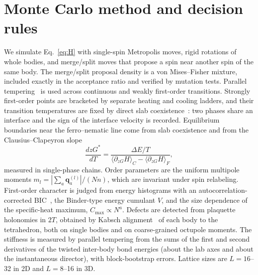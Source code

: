 \documentclass[pre,twocolumn,superscriptaddress,amsmath,amssymb,floatfix]{revtex4-2}
\newcommand{\qv}{\mathbf{q}}
\begin{document}
\section{Monte Carlo method and decision rules}\label{sec:MC}

We simulate Eq.~\eqref{eq:H} with single-spin Metropolis moves, rigid rotations of whole bodies, and merge/split moves that propose a spin near another spin of the same body. The merge/split proposal density is a von Mises--Fisher mixture, included exactly in the acceptance ratio and verified by mutation tests. Parallel tempering~\cite{Hukushima1996} is used across continuous and weakly first-order transitions. Strongly first-order points are bracketed by separate heating and cooling ladders, and their transition temperatures are fixed by direct slab coexistence~\cite{Espinosa2013}: two phases share an interface and the sign of the interface velocity is recorded. Equilibrium boundaries near the ferro--nematic line come from slab coexistence and from the Clausius--Clapeyron slope
\begin{equation}
\frac{dzG^*}{dT}=\frac{\Delta E/T}{\langle\partial_{zG}H\rangle_C-\langle\partial_{zG}H\rangle_F},
\end{equation}
measured in single-phase chains. Order parameters are the uniform multipole moments $m_l=|\sum_a\qv_a^{(l)}|/(Nn)$, which are invariant under spin relabeling. First-order character is judged from energy histograms with an autocorrelation-corrected BIC~\cite{ChallaLandauBinder1986}, the Binder-type energy cumulant $V$, and the size dependence of the specific-heat maximum, $C_{\max}\propto N^{a}$. Defects are detected from plaquette holonomies in $2T$, obtained by Kabsch alignment~\cite{Kabsch1976} of each body to the tetrahedron, both on single bodies and on coarse-grained octupole moments. The stiffness is measured by parallel tempering from the sums of the first and second derivatives of the twisted inter-body bond energies (about the lab axes and about the instantaneous director), with block-bootstrap errors. Lattice sizes are $L=16$--32 in 2D and $L=8$--16 in 3D.
\end{document}
